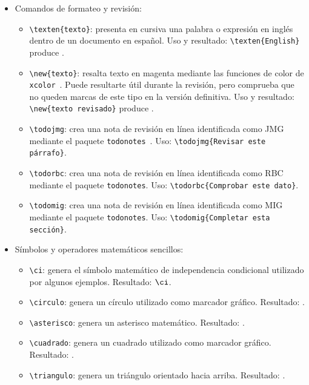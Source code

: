\begin{itemize}
  \item Comandos de formateo y revisión:
  \begin{itemize}
    \item \texttt{\textbackslash{}texten\{texto\}}: presenta en cursiva una palabra o expresión en inglés dentro de un documento en español. Uso y resultado: \texttt{\textbackslash{}texten\{English\}} produce .
    \item \texttt{\textbackslash{}new\{texto\}}: resalta texto en magenta mediante las funciones de color de \texttt{xcolor}~\cite{xcolor-manual}. Puede resultarte útil durante la revisión, pero comprueba que no queden marcas de este tipo en la versión definitiva. Uso y resultado: \texttt{\textbackslash{}new\{texto revisado\}} produce .
    \item \texttt{\textbackslash{}todojmg}: crea una nota de revisión en línea identificada como JMG mediante el paquete \texttt{todonotes}~\cite{todonotes-manual}. Uso: \texttt{\textbackslash{}todojmg\{Revisar este párrafo\}}.
    \item \texttt{\textbackslash{}todorbc}: crea una nota de revisión en línea identificada como RBC mediante el paquete \texttt{todonotes}. Uso: \texttt{\textbackslash{}todorbc\{Comprobar este dato\}}.
    \item \texttt{\textbackslash{}todomig}: crea una nota de revisión en línea identificada como MIG mediante el paquete \texttt{todonotes}. Uso: \texttt{\textbackslash{}todomig\{Completar esta sección\}}.
  \end{itemize}
  \item Símbolos y operadores matemáticos sencillos:
  \begin{itemize}
    \item \texttt{\textbackslash{}ci}: genera el símbolo matemático de independencia condicional utilizado por algunos ejemplos. Resultado: \(\ci\).
    \item \texttt{\textbackslash{}circulo}: genera un círculo utilizado como marcador gráfico. Resultado: {\circulo}.
    \item \texttt{\textbackslash{}asterisco}: genera un asterisco matemático. Resultado: {\asterisco}.
    \item \texttt{\textbackslash{}cuadrado}: genera un cuadrado utilizado como marcador gráfico. Resultado: {\cuadrado}.
    \item \texttt{\textbackslash{}triangulo}: genera un triángulo orientado hacia arriba. Resultado: {\triangulo}.

\end{itemize}
\end{itemize}
